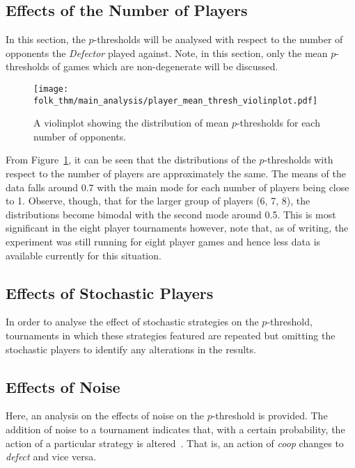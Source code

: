 \subsection{Effects of the Number of Players}\label{subsec:Effects_of_the_number_of_Players}
In this section, the \(p\)-thresholds will be analysed with respect to the
number of opponents the \textit{Defector} played against. Note, in this section,
only the mean \(p\)-thresholds of games which are non-degenerate will be discussed. 


\begin{figure}
    \centering
    \texttt{[image: folk\_thm/main\_analysis/player\_mean\_thresh\_violinplot.pdf]}
    \caption{A violinplot showing the distribution of mean \(p\)-thresholds for each number of opponents.}\label{fig:player_mean_thresh_violinplot}
\end{figure}

From Figure~\ref{fig:player_mean_thresh_violinplot}, it can be seen that the
distributions of the \(p\)-thresholds with respect to the number of players are
approximately the same. The means of the data falls around 0.7 with the main
mode for each number of players being close to 1. Observe, though, that for the
larger group of players (6, 7, 8), the distributions become bimodal with the
second mode around 0.5. This is most significant in the eight player tournaments
however, note that, as of writing, the experiment was still running for eight
player games and hence less data is available currently for this situation.


\subsection{Effects of Stochastic Players}\label{subsec:Effects_of_Stochastic_Players}

In order to analyse the effect of stochastic strategies on the \(p\)-threshold,
tournaments in which these strategies featured are repeated but omitting the
stochastic players to identify any alterations in the results. 




\subsection{Effects of Noise}\label{subsec:Effects_of_Noise}

Here, an analysis on the effects of noise on the \(p\)-threshold is provided.
The addition of noise to a tournament indicates that, with a certain
probability, the action of a particular strategy is
altered~\cite{glynatsi2020meta}. That is, an action of \textit{coop} changes to
\textit{defect} and vice versa.  

